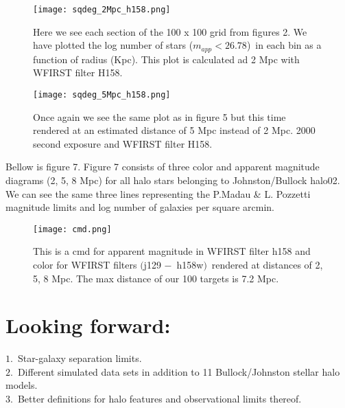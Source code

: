\documentclass[11pt,a4paper,fleqn,notitlepage,oneside]{article}
\begin{document}
		\begin{figure}[H]\centering
			\texttt{[image: sqdeg\_2Mpc\_h158.png]}
		\caption{
			Here we see each section of the 100 x 100 grid from figures 2.
			We have plotted the log number of stars ($m_{app}<26.78$)\ in each bin as a function of radius (Kpc).
			This plot is calculated ad 2 Mpc with WFIRST filter H158.
		}
		\label{fig:nstars as function of radius 2Mpc}
		\end{figure}

		\begin{figure}[H]\centering
			\texttt{[image: sqdeg\_5Mpc\_h158.png]}
		\caption{
			Once again we see the same plot as in figure 5 but this time rendered at an estimated distance of 5 Mpc instead of 2 Mpc.
			2000 second exposure and WFIRST filter H158.
		}
		\label{fig:nstars as function of radius 5Mpc}
		\end{figure}

		Bellow is figure 7.
		Figure 7 consists of three color and apparent magnitude diagrams (2, 5, 8 Mpc) for all halo stars belonging to Johnston/Bullock halo02.
		We can see the same three lines representing the P.Madau \& L. Pozzetti magnitude limits and log number of galaxies per square arcmin.

		\begin{figure}[H]\centering
			\texttt{[image: cmd.png]}
		\caption{
			This is a cmd for apparent magnitude in WFIRST filter h158 and color for WFIRST filters $($j129 $-$\ h158w$)$\ rendered at distances of 2, 5, 8 Mpc.
			The max distance of our 100 targets is 7.2 Mpc.
		}
		\label{fig:cmd}
		\end{figure}


\section{Looking forward:} %
	\label{sec:looking_forward}

	$1.$\ Star-galaxy separation limits.\\

	$2.$\ Different simulated data sets in addition to 11 Bullock/Johnston stellar halo models.\\

	$3.$\ Better definitions for halo features and observational limits thereof.\\




{}


\end{document}
